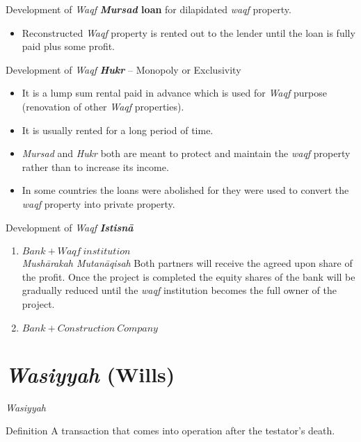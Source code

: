 \begin{frame}{Development of \textit{Waqf}}
\textbf{\textit{Mursad} loan} for dilapidated \textit{waqf} property.
\begin{itemize}
\item Reconstructed \textit{Waqf} property is rented out to the lender until the loan is fully paid plus some profit.
\end{itemize}
\end{frame}

\begin{frame}{Development of \textit{Waqf}}
\textbf{\textit{Hukr}} – Monopoly or Exclusivity\\
\begin{itemize}
  \item It is a lump sum rental paid in advance which is used for \textit{Waqf} purpose (renovation of other \textit{Waqf} properties).
  \item It is usually rented for a long period of time.
  \item \textit{Mursad} and \textit{Hukr} both are meant to protect and maintain the \textit{waqf} property rather than to increase its income.
  \item In some countries the loans were abolished for they were used to convert the \textit{waqf} property into private property.
\end{itemize}
\end{frame}

\begin{frame}{Development of \textit{Waqf}}
\textbf{\textit{Istisnā}}
\begin{enumerate}
\item $Bank + \textit{Waqf}\  institution$\\
\alert{\textit{Mushārakah Mutanāqisah}} Both partners will receive the agreed upon share of the profit. Once the project is completed the equity shares of the bank will be gradually reduced until the \textit{waqf} institution becomes the full owner of the project.
\item $Bank + Construction \ Company$
\end{enumerate}
\end{frame}

\section{\textit{Wasiyyah} (Wills)}

\begin{frame}{\textit{Wasiyyah}}
\begin{block}{Definition}
A transaction that comes into operation after the testator's death.
\end{block}
\end{frame}

